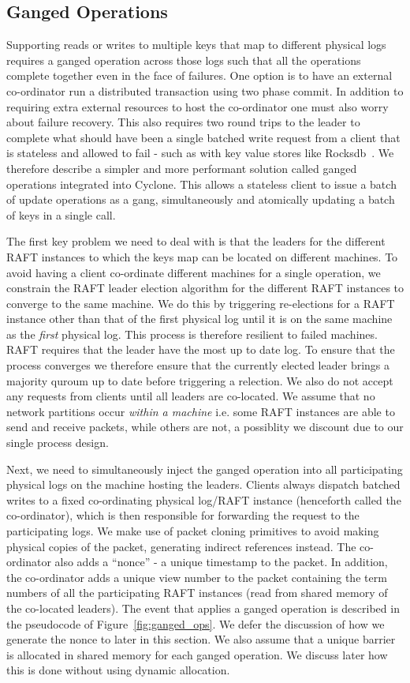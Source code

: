 \documentclass[pageno]{jpaper}
\begin{document}
\subsection{Ganged Operations}
Supporting reads or writes to multiple keys that map to different physical logs
requires a ganged operation across those logs such that all the operations
complete together even in the face of failures. One option is to have an
external co-ordinator run a distributed transaction using two phase commit. In
addition to requiring extra external resources to host the co-ordinator one must
also worry about failure recovery. This also requires two round trips to the
leader to complete what should have been a single batched write request from a
client that is stateless and allowed to fail - such as with key value stores
like Rocksdb~\cite{rocksdb}. We therefore describe a simpler and more performant
solution called ganged operations integrated into Cyclone. This allows a
stateless client to issue a batch of update operations as a gang, simultaneously
and atomically updating a batch of keys in a single call.

The first key problem we need to deal with is that the leaders for the different
RAFT instances to which the keys map can be located on different machines. To
avoid having a client co-ordinate different machines for a single operation, we
constrain the RAFT leader election algorithm for the different RAFT instances to
converge to the same machine. We do this by triggering re-elections for a RAFT
instance other than that of the first physical log until it is on the same
machine as the \emph{first} physical log. This process is therefore resilient to
failed machines. RAFT requires that the leader have the most up to date log. To
ensure that the process converges we therefore ensure that the currently elected
leader brings a majority quroum up to date before triggering a relection. We
also do not accept any requests from clients until all leaders are
co-located. We assume that no network partitions occur \emph{within a machine}
i.e. some RAFT instances are able to send and receive packets, while others are
not, a possiblity we discount due to our single process design.

Next, we need to simultaneously inject the ganged operation into all
participating physical logs on the machine hosting the leaders. Clients always
dispatch batched writes to a fixed co-ordinating physical log/RAFT instance
(henceforth called the co-ordinator), which is then responsible for forwarding
the request to the participating logs. We make use of packet cloning primitives
to avoid making physical copies of the packet, generating indirect references
instead. The co-ordinator also adds a ``nonce'' - a unique timestamp to the
packet. In addition, the co-ordinator adds a unique view number to the packet
containing the term numbers of all the participating RAFT instances (read from
shared memory of the co-located leaders).  The event that applies a ganged
operation is described in the pseudocode of Figure~\ref{fig:ganged_ops}. We
defer the discussion of how we generate the nonce to later in this section. We
also assume that a unique barrier is allocated in shared memory for each ganged
operation. We discuss later how this is done without using dynamic allocation.
\end{document}
